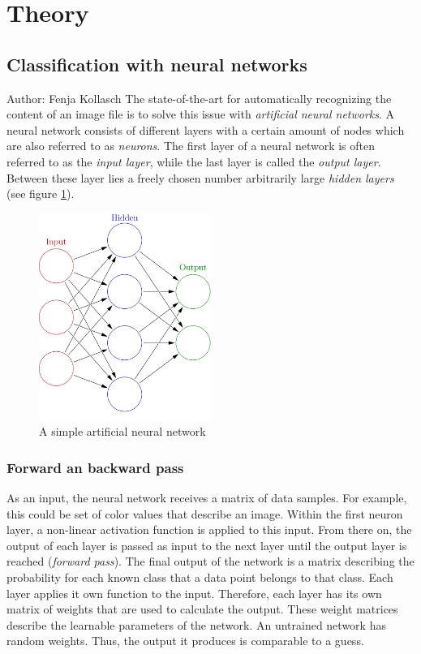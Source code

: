 \documentclass[11pt]{article}
\begin{document}
	\section{Theory}
	\subsection{Classification with neural networks}	
	\small{Author: Fenja Kollasch} \newline \newline
	The state-of-the-art for automatically recognizing the content of an image file is to solve this issue with \textit{artificial neural networks}. A neural network consists of different layers with a certain amount of nodes which are also referred to as \textit{neurons}. The first layer of a neural network is often referred to as the \textit{input layer}, while the last layer is called the \textit{output layer}. Between these layer lies a freely chosen number arbitrarily large \textit{hidden layers} (see figure \ref{fig:simple-nn}).
	
	\begin{figure}[h!]
		\centering
		\includegraphics[width=0.5\textwidth]{ImagesForReport/simple-nn.png}
		\caption{A simple artificial neural network}
		\label{fig:simple-nn}
	\end{figure}
	
	\subsubsection{Forward an backward pass}
	As an input, the neural network receives a matrix of data samples. For example, this could be set of color values that describe an image. Within the first neuron layer, a non-linear activation function is applied to this input. From there on, the output of each layer is passed as input to the next layer until the output layer is reached (\textit{forward pass}). The final output of the network is a matrix describing the probability for each known class that a data point belongs to that class. Each layer applies it own function to the input. Therefore, each layer has its own matrix of weights that are used to calculate the output. These weight matrices describe the learnable parameters of the network. An untrained network has random weights. Thus, the output it produces is comparable to a guess.
	
\end{document}
